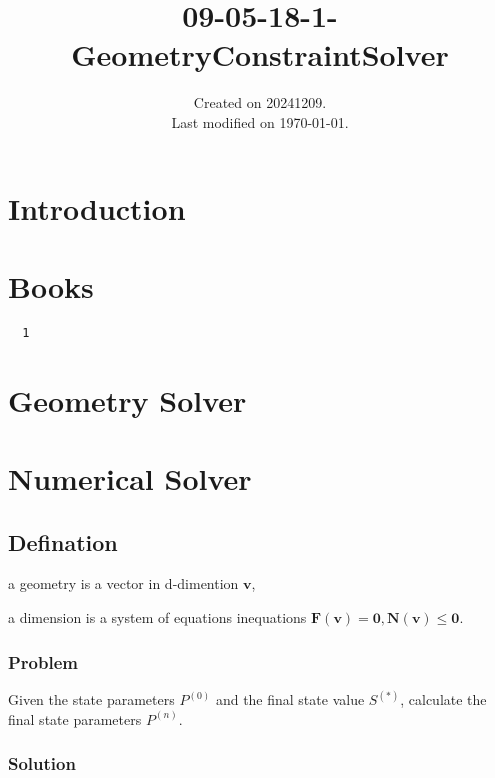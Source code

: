 \documentclass[UTF8]{../09-Mathematics}
\begin{document}
\title{09-05-18-1-GeometryConstraintSolver}
\date{Created on 20241209.\\   Last modified on \today.}
\maketitle
\tableofcontents


\chapter{Introduction}



\chapter{Books}

\begin{lstlisting}
  1

\end{lstlisting}

\chapter{Geometry Solver}




\chapter{Numerical Solver}


\section{Defination}

a geometry is a vector in d-dimention $\boldsymbol v$,

a dimension is a system of equations inequations $\boldsymbol F(\boldsymbol v)= \boldsymbol 0, \boldsymbol N(\boldsymbol v)\leqslant \boldsymbol 0 $.



\subsection{Problem}

Given the state parameters $P^{(0)}$ and the final state value $S^{(*)}$, calculate the final state parameters $P^{(n)}$.




\subsection{Solution}
\end{document}
